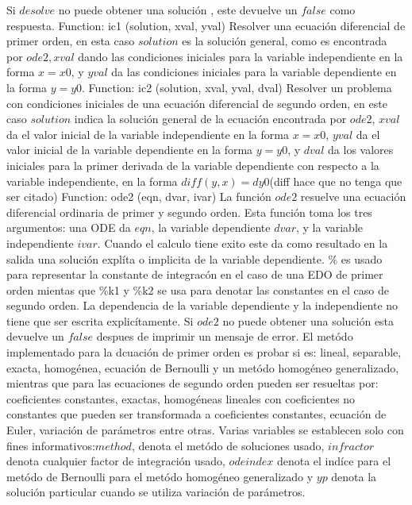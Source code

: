 \documentclass{article}
\begin{document}
Si $desolve$ no puede obtener una solución , este devuelve un $false$ como respuesta.
\newline
Function: ic1 (solution, xval, yval)
\newline
Resolver una ecuación diferencial de primer orden, en esta caso $solution$ es la solución general, como es encontrada por $ode2, xval$ dando las condiciones iniciales para la variable independiente en la forma $x= x0$, y $yval$ da las condiciones iniciales para la variable dependiente en la forma $y= y0$.
\newline
Function: ic2 (solution, xval, yval, dval)
\newline
Resolver un problema con condiciones iniciales de una ecuación diferencial de segundo orden, en este caso $solution$ indica la solución general de la ecuación encontrada por $ode2$, $xval$ da el valor inicial de la variable independiente en la forma $x= x0$, $yval$ da el valor inicial de la variable dependiente en la forma $y= y0$, y $dval$ da los valores iniciales para la primer derivada de la variable dependiente con respecto a la variable independiente, en la forma $diff(y,x)= dy0$(diff hace que no tenga que ser citado)
\newline
Function: ode2 (eqn, dvar, ivar)
\newline
La función $ode2$ resuelve una ecuación diferencial ordinaria de primer y segundo orden. Esta función toma los tres argumentos: una ODE da $eqn$, la variable dependiente $dvar$, y la variable independiente $ivar$. Cuando el calculo tiene exito este da como resultado en la salida una solución explíta o implicita de la variable dependiente. \% es usado para representar la constante de integracón en el caso de una EDO de primer orden mientas que \%k1 y \%k2 se usa para denotar las constantes en el caso de segundo orden. La dependencia de la variable dependiente y la independiente no tiene que ser escrita explicítamente.
\newline
Si $ode2$ no puede obtener una solución esta devuelve un
$false$ despues de imprimir un mensaje de error. El metódo implementado para la dcuación de primer orden es probar si es: lineal, separable, exacta, homogénea, ecuación de Bernoulli y un metódo homogéneo generalizado, mientras que para las ecuaciones de segundo orden pueden ser resueltas por: coeficientes constantes, exactas, homogéneas lineales con coeficientes no constantes que pueden ser transformada a coeficientes constantes, ecuación de Euler, variación de parámetros entre otras.
\newline
Varias variables se establecen solo con fines informativos:$method$, denota el metódo de soluciones usado, $infractor$ denota cualquier factor de integración usado, $odeindex$ denota el indíce para el metódo de Bernoulli para el metódo homogéneo generalizado y $yp$ denota la solución particular cuando se utiliza variación de parámetros.
\end{document}
